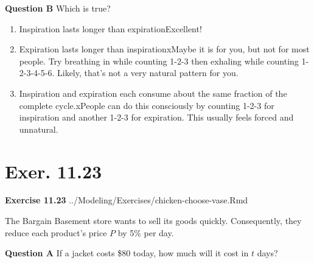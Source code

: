 \documentclass[
  letterpaper,
  DIV=11,
  numbers=noendperiod,
  oneside]{article}
\providecommand{\tightlist}{%
  \setlength{\itemsep}{0pt}\setlength{\parskip}{0pt}}\usepackage{longtable,booktabs,array}
\begin{document}
\begin{multicols}{2}
\begin{table}
\begin{minipage}[t]{\linewidth}
{\textbf{Question B} Which is true?

\begin{enumerate}
\def\labelenumi{\roman{enumi}.}
\tightlist
\item
  {Inspiration lasts longer than expiration{Excellent!~}}\\
\item
  {Expiration lasts longer than inspiration{xMaybe it is for you, but
  not for most people. Try breathing in while counting 1-2-3 then
  exhaling while counting 1-2-3-4-5-6. Likely, that's not a very natural
  pattern for you.}}\\
\item
  {Inspiration and expiration each consume about the same fraction of
  the complete cycle.{xPeople can do this consciously by counting
  1-2-3 for inspiration and another 1-2-3 for expiration. This usually
  feels forced and unnatural.}}
\end{enumerate}

}

\end{minipage}%
\newline
\begin{minipage}[t]{\linewidth}

{\centering 

\hypertarget{exer.-11.23}{%
\section*{Exer. 11.23}\label{exer.-11.23}}

\textbf{Exercise 11.23} ../Modeling/Exercises/chicken-choose-vase.Rmd

}

\end{minipage}%
\newline
\begin{minipage}[t]{\linewidth}

{\centering 

The Bargain Basement store wants to sell its goods quickly.
Consequently, they reduce each product's price \(P\) by 5\% per day.

}

\end{minipage}%
\newline
\begin{minipage}[t]{\linewidth}

{\centering 

\textbf{Question A} If a jacket costs \$80 today, how much will it cost
in \(t\) days?

}
\end{minipage}
\end{table}
\end{multicols}
\end{document}
